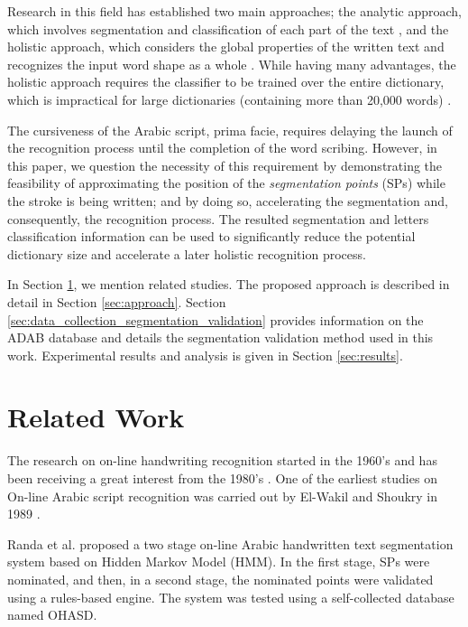 \documentclass[10pt, conference, compsocconf]{IEEEtran}
\begin{document}
Research in this field has established two main approaches; the analytic approach, which involves segmentation and classification of each part of the text \cite{abdulla2008off, sari2002off, Dinges2011}, and the holistic approach, which considers the global properties of the written text and recognizes the input word shape as a whole \cite{biadsy2011segmentation, saabni2009hierarchical}. 
While having many advantages, the holistic approach requires the classifier to be trained over the entire dictionary, which is impractical for large dictionaries (containing more than 20,000 words) \cite{elanwar2012unconstrained}.

The cursiveness of the Arabic script, prima facie, requires delaying the launch of the recognition process until the completion of the word scribing. 
However, in this paper, we question the necessity of this requirement by demonstrating the feasibility of approximating the position of the \emph{segmentation points} (SPs) while the stroke is being written; and by doing so, accelerating the segmentation and, consequently, the recognition process. 
The resulted segmentation and letters classification information can be used to significantly reduce the potential dictionary size and accelerate a later holistic recognition process.

In Section \ref{sec:related_work}, we mention related studies.
The proposed approach is described in detail in Section \ref{sec:approach}.
Section \ref{sec:data_collection_segmentation_validation} provides information on the ADAB database and details the segmentation validation method used in this work.
Experimental results and analysis is given in Section \ref{sec:results}. 

\section{Related Work}
\label{sec:related_work}
The research on on-line handwriting recognition started in the 1960's and has been receiving a great interest from the 1980's \cite{tagougui2013online}. 
One of the earliest studies on On-line Arabic script recognition was carried out by El-Wakil and Shoukry in 1989 \cite{el1989line}.

Randa et al. \cite{elanwar2012unconstrained} proposed a two stage on-line Arabic handwritten text segmentation system based on Hidden Markov Model (HMM). 
In the first stage, SPs were nominated, and then, in a second stage, the nominated points were validated using a rules-based engine. 
The system was tested using a self-collected database named OHASD.
\end{document}

